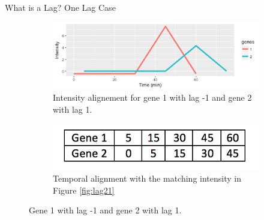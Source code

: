 \documentclass[10pt]{beamer}
\begin{document}
\begin{frame}{What is a Lag? One Lag Case}
\begin{figure}
    \centering
        \begin{subfigure}{.75\textwidth}
          \centering
          \includegraphics[width=1.2\linewidth]{lag3.png}
          \caption{Intensity alignement for gene 1 with lag -1 and gene 2 with lag 1. }
          \label{fig:lag31}
        \end{subfigure}
       \begin{subfigure}{.75\textwidth}
          \centering
          \includegraphics[width=.8\linewidth]{table3.png}
          \caption{Temporal alignment with the matching intensity in Figure \ref{fig:lag21}}
          \label{fig:lag32}
        \end{subfigure}
    \caption{Gene 1 with lag -1 and gene 2 with lag 1.}
    \label{fig:test}
    \end{figure}

\end{frame}
\end{document}
